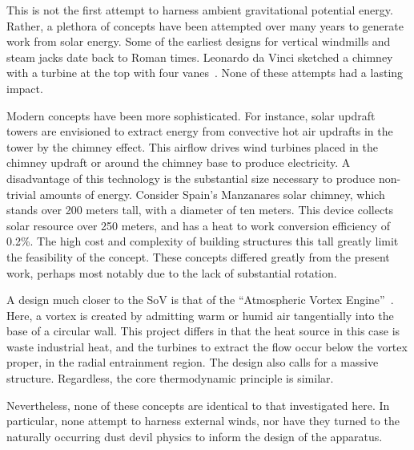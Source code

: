 This is not the first attempt to harness ambient gravitational potential
energy. Rather, a plethora of concepts have been attempted over many
years to generate work from solar energy. 
%
%
%
Some of the earliest designs for vertical windmills and steam jacks date
back to Roman times\cite{hills1996power}. Leonardo da Vinci sketched a
chimney with a turbine at the top with four
vanes~\cite{lugt1983vortex}. None of these attempts had a lasting impact. 

% 

%
%
Modern concepts have been more sophisticated. For instance, solar
updraft towers are envisioned to extract energy from convective hot air
updrafts in the tower by the chimney effect. This airflow drives wind
turbines placed in the chimney updraft or around the chimney base to
produce electricity. A disadvantage of this technology is the
substantial size necessary to produce non-trivial amounts of energy. 
%
%
Consider Spain's Manzanares solar chimney, which stands over 200 meters
tall, with a diameter of ten meters. This device collects solar
resource over 250 meters, and has a heat to work conversion efficiency
of 0.2\%\cite{schlaich2005design}. The high cost and complexity of
building structures this tall greatly limit the feasibility of the
concept. These concepts differed greatly from the present work, perhaps
most notably due to the lack of substantial rotation. 

%
%
A design much closer to the SoV is that of the ``Atmospheric Vortex
Engine''~\cite{vortex_engine,michaud2006atmospheric}. Here, a vortex is
created by admitting warm or humid air tangentially into the base of a
circular wall. This project differs in that the heat source in this case
is waste industrial heat, and the turbines to extract
the flow occur below the vortex proper, in the radial entrainment
region. The design also calls for a massive structure. Regardless, the
core thermodynamic principle is similar.   

Nevertheless, none of these concepts are identical to that investigated
here. In particular, none attempt to harness external winds, nor have
they turned to the naturally occurring dust devil physics to inform
the design of the apparatus.  

%
%
%
%
%
%
%
%
